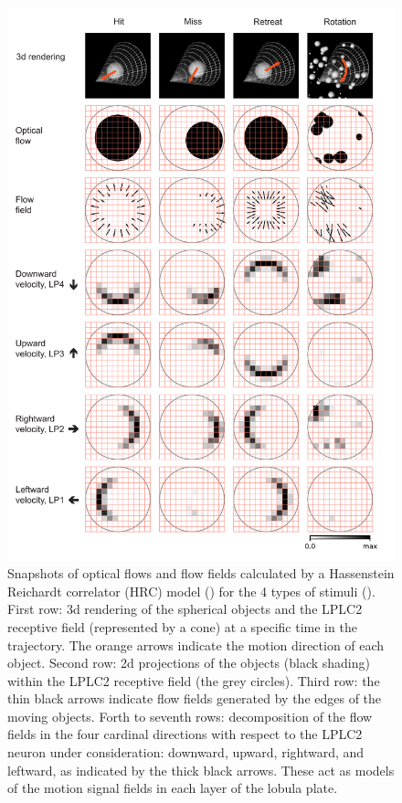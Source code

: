 \documentclass[pdftex,9pt,lineno]{elife}
\begin{document}
\begin{figure}
\includegraphics[width=\linewidth]{figures/stimuli_2_paper.pdf}
\caption{Snapshots of optical flows and flow fields calculated by a Hassenstein Reichardt correlator (HRC) model () for the 4 types of stimuli (). First row: 3d rendering of the spherical objects and the LPLC2 receptive field (represented by a cone) at a specific time in the trajectory. The orange arrows indicate the motion direction of each object. Second row: 2d projections of the objects (black shading) within the LPLC2 receptive field (the grey circles). Third row: the thin black arrows indicate flow fields generated by the edges of the moving objects. Forth to seventh rows: decomposition of the flow fields in the four cardinal directions with respect to the LPLC2 neuron under consideration: downward, upward, rightward, and leftward, as indicated by the thick black arrows. These act as models of the motion signal fields in each layer of the lobula plate.}

\end{figure}
\end{document}
